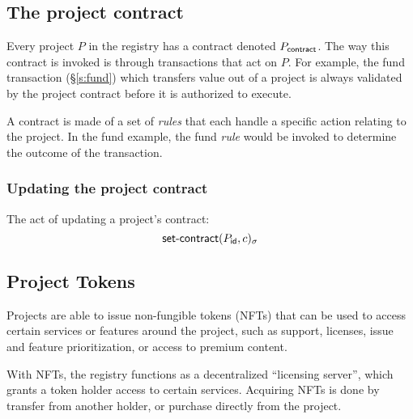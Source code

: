 \subsection{The project contract}
Every project $P$ in the registry has a contract denoted $P_{\mathsf{contract}}$.
The way this contract is invoked is through transactions that act on $P$. For
example, the \textsf{fund} transaction (\S\ref{s:fund}) which transfers value
out of a project is always validated by the project contract before it
is authorized to execute.

A contract is made of a set of \emph{rules} that each handle a specific action
relating to the project. In the \textsf{fund} example, the \textsf{fund}
\emph{rule} would be invoked to determine the outcome of the transaction.

\subsubsection{Updating the project contract}
The act of updating a project's contract:
\[
    \operatorname{\mathsf{set-contract}}\lparen P_{\mathsf{id}}, c\rparen_\sigma
\]


\subsection{Project Tokens}
Projects are able to issue non-fungible tokens (NFTs) that can be used to
access certain services or features around the project, such as support,
licenses, issue and feature prioritization, or access to premium content.

With NFTs, the registry functions as a decentralized ``licensing server'',
which grants a token holder access to certain services. Acquiring NFTs
is done by transfer from another holder, or purchase directly from the
project.

